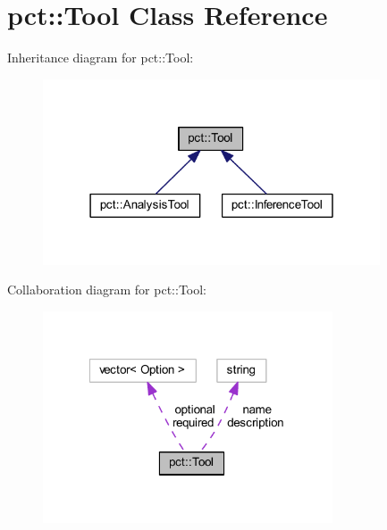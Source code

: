 \hypertarget{classpct_1_1_tool}{\section{pct\-:\-:Tool Class Reference}
\label{classpct_1_1_tool}
}


Inheritance diagram for pct\-:\-:Tool\-:\nopagebreak
\begin{figure}[H]
\begin{center}
\leavevmode
\includegraphics[width=283pt]{classpct_1_1_tool__inherit__graph}
\end{center}
\end{figure}


Collaboration diagram for pct\-:\-:Tool\-:\nopagebreak
\begin{figure}[H]
\begin{center}
\leavevmode
\includegraphics[width=243pt]{classpct_1_1_tool__coll__graph}
\end{center}
\end{figure}
